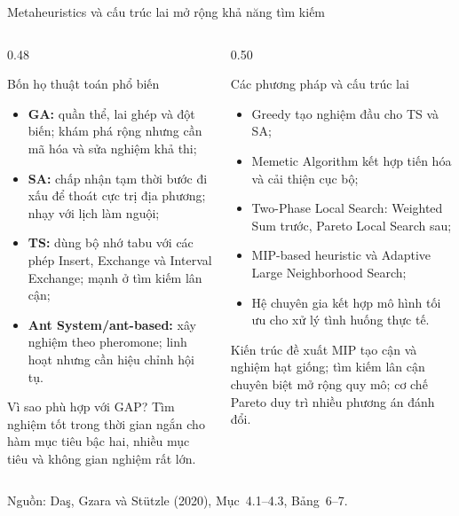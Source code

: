 \documentclass[aspectratio=169,10pt]{beamer}
\begin{document}
\begin{frame}[t]{Metaheuristics và cấu trúc lai mở rộng khả năng tìm kiếm}

\footnotesize
\begin{columns}[T,onlytextwidth]
\begin{column}{0.48\textwidth}
\begin{block}{Bốn họ thuật toán phổ biến}
\begin{itemize}
    \setlength{\itemsep}{1pt}
    \item \textbf{GA:} quần thể, lai ghép và đột biến; khám phá rộng nhưng cần mã hóa và sửa nghiệm khả thi;
    \item \textbf{SA:} chấp nhận tạm thời bước đi xấu để thoát cực trị địa phương; nhạy với lịch làm nguội;
    \item \textbf{TS:} dùng bộ nhớ tabu với các phép Insert, Exchange và Interval Exchange; mạnh ở tìm kiếm lân cận;
    \item \textbf{Ant System/ant-based:} xây nghiệm theo pheromone; linh hoạt nhưng cần hiệu chỉnh hội tụ.
\end{itemize}
\end{block}

\begin{alertblock}{Vì sao phù hợp với GAP?}
Tìm nghiệm tốt trong thời gian ngắn cho hàm mục tiêu bậc hai,
nhiều mục tiêu và không gian nghiệm rất lớn.
\end{alertblock}
\end{column}

\begin{column}{0.50\textwidth}
\begin{exampleblock}{Các phương pháp và cấu trúc lai}
\begin{itemize}
    \setlength{\itemsep}{1pt}
    \item Greedy tạo nghiệm đầu cho TS và SA;
    \item Memetic Algorithm kết hợp tiến hóa và cải thiện cục bộ;
    \item Two-Phase Local Search: Weighted Sum trước, Pareto Local Search sau;
    \item MIP-based heuristic và Adaptive Large Neighborhood Search;
    \item Hệ chuyên gia kết hợp mô hình tối ưu cho xử lý tình huống thực tế.
\end{itemize}
\end{exampleblock}

\begin{block}{Kiến trúc đề xuất}
MIP tạo cận và nghiệm hạt giống; tìm kiếm lân cận chuyên biệt mở rộng quy mô;
cơ chế Pareto duy trì nhiều phương án đánh đổi.
\end{block}
\end{column}
\end{columns}

\vfill
\tiny Nguồn: Da\c{s}, Gzara và St\"utzle (2020), Mục~4.1--4.3, Bảng~6--7.
\end{frame}
\end{document}
